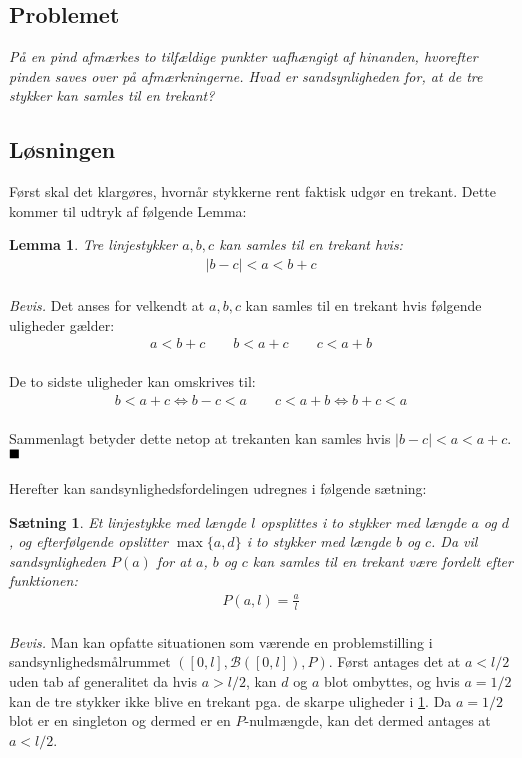 \documentclass[a4paper,12pt]{article}
\newtheorem{theorem}[section]{Sætning}
\newtheorem{lemma}[section]{Lemma}
\renewcommand{\qed}{\hfill\blacksquare}
\newcommand{\lr}{\Leftrightarrow}
\newcommand{\eq}[1]{\begin{align*} #1\\ \end{align*}}
\begin{document}
\noindent
\pagestyle{fancy}
\setlength\headsep{15pt}

\subsection*{Problemet}
\textit{På en pind afmærkes to tilfældige punkter uafhængigt af hinanden, hvorefter pinden saves over på afmærkningerne. Hvad er sandsynligheden for, at de tre stykker kan samles til en trekant?}\\

\subsection*{Løsningen}
Først skal det klargøres, hvornår stykkerne rent faktisk udgør en trekant. Dette kommer til udtryk af følgende Lemma:
\begin{lemma}
\label{lemma1}
Tre linjestykker $a,b,c$ kan samles til en trekant hvis:
\eq{
|b-c|<a<b+c
}
\end{lemma}
\textit{Bevis.}
Det anses for velkendt at $a,b,c$ kan samles til en trekant hvis følgende uligheder gælder:
\eq{
a<b+c\qquad b<a+c\qquad c<a+b
}

De to sidste uligheder kan omskrives til:
\eq{
b<a+c\lr b-c<a\qquad c<a+b\lr b+c<a
}

Sammenlagt betyder dette netop at trekanten kan samles hvis $|b-c|<a<a+c$.$\qed$\\\\

Herefter kan sandsynlighedsfordelingen udregnes i følgende sætning:
\begin{theorem}
\label{saetning}
Et linjestykke med længde $l$ opsplittes i to stykker med længde $a$ og $d$, og efterfølgende opslitter $\max\{a,d\}$ i to stykker med længde $b$ og $c$. Da vil sandsynligheden $P(a)$ for at $a$, $b$ og $c$ kan samles til en trekant være fordelt efter funktionen:
\eq{
P(a,l)=\frac{a}{l}
}
\end{theorem}
\textit{Bevis.}
Man kan opfatte situationen som værende en problemstilling i sandsynlighedsmålrummet $([0,l],\mathcal{B}([0,l]),P)$. Først antages det at $a<l/2$ uden tab af generalitet da hvis $a>l/2$, kan $d$ og $a$ blot ombyttes, og hvis $a=1/2$ kan de tre stykker ikke blive en trekant pga. de skarpe uligheder i \ref{lemma1}. Da $a=1/2$ blot er en singleton og dermed er en $P$-nulmængde, kan det dermed antages at $a<l/2$.\\
\end{document}
